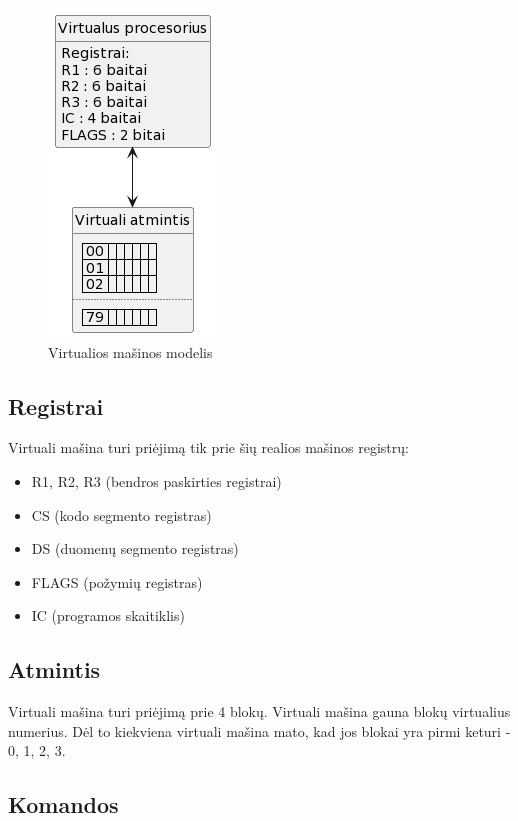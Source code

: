 \documentclass{VUMIFInfKursinis}
\begin{document}
\begin{figure}[H]
	\centering	
	\includegraphics[scale=0.65]{img/virtuali_masina}
	\caption{Virtualios mašinos modelis}   %
	\label{img:virtuali_masina}
\end{figure}

\subsection{Registrai}

Virtuali mašina turi priėjimą tik prie šių realios mašinos registrų:

\begin{itemize}
	\item R1, R2, R3 (bendros paskirties registrai)
	\item CS (kodo segmento registras)
	\item DS (duomenų segmento registras)
	\item FLAGS (požymių registras)
	\item IC (programos skaitiklis)
\end{itemize}

\subsection{Atmintis}

Virtuali mašina turi priėjimą prie 4 blokų. Virtuali mašina gauna blokų virtualius numerius. Dėl to kiekviena virtuali mašina mato, kad jos blokai yra pirmi keturi - 0, 1, 2, 3.

\subsection{Komandos}
\end{document}
